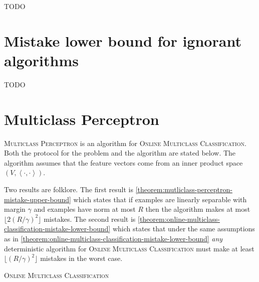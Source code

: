 \documentclass[12pt]{article}
\newcommand{\ip}[2]{\left\langle #1, #2 \right\rangle} %
\begin{document}
TODO

\section{Mistake lower bound for ignorant algorithms}

TODO




\appendix

\section{Multiclass Perceptron}
\label{section:multiclass-perceptron-proofs}

\textsc{Multiclass Perceptron} is an algorithm for \textsc{Online Multiclass
Classification}. Both the protocol for the problem and the algorithm are stated
below. The algorithm assumes that the feature vectors come from an inner product
space $(V, \ip{\cdot}{\cdot})$.

Two results are folklore. The first result is
\autoref{theorem:mutliclass-perceptron-mistake-upper-bound} which states that if
examples are linearly separable with margin $\gamma$ and examples have norm
at most $R$ then the algorithm makes at most $\lfloor 2 (R/\gamma)^2 \rfloor$
mistakes. The second result is
\autoref{theorem:online-multiclass-classification-mistake-lower-bound} which
states that under the same assumptions as in
\autoref{theorem:online-multiclass-classification-mistake-lower-bound}
\emph{any} deterministic algorithm for \textsc{Online Multiclass Classification}
must make at least $\lfloor (R/\gamma)^2 \rfloor$ mistakes in the worst case.

\begin{algorithm}[h]
\caption{\textsc{Online Multiclass Classification}
\label{algorithm:mutliclass-classification}}
\begin{algorithmic}[1]
{
\ENDFOR
}
\end{algorithmic}
\end{algorithm}
\end{document}
